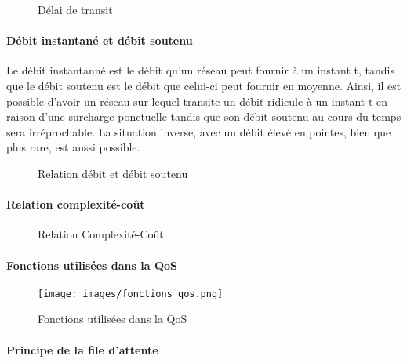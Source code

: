 \documentclass[french]{article}
\begin{document}
\begin{figure}[h]
	\caption{Délai de transit}
	\label{fig:delai_de_transit}
\end{figure} 

\paragraph{Débit instantané et débit soutenu}

Le débit instantanné est le débit qu'un réseau peut fournir à un instant t, tandis que le débit soutenu est le débit que celui-ci peut fournir en moyenne.
Ainsi, il est possible d'avoir un réseau sur lequel transite un débit ridicule à un instant t en raison d'une surcharge ponctuelle tandis que son débit soutenu au cours du temps sera irréprochable. La situation inverse, avec un débit élevé en pointes, bien que plus rare, est aussi possible.

\begin{figure}[h]
	\caption{Relation débit et débit soutenu}
	\label{fig:relation_debit_instantane_vs_soutenu}
\end{figure} 

\paragraph{Relation complexité-coût}

\begin{figure}[h]
	\caption{Relation Complexité-Coût}
	\label{fig:relation_complexite_cout}
\end{figure} 

\paragraph{Fonctions utilisées dans la QoS}

\begin{figure}[h]
	\texttt{[image: images/fonctions\_qos.png]}
	\caption{Fonctions utilisées dans la QoS}
	\label{fig:fonctions_qos}
\end{figure} 

\paragraph{Principe de la file d'attente}
\end{document}
